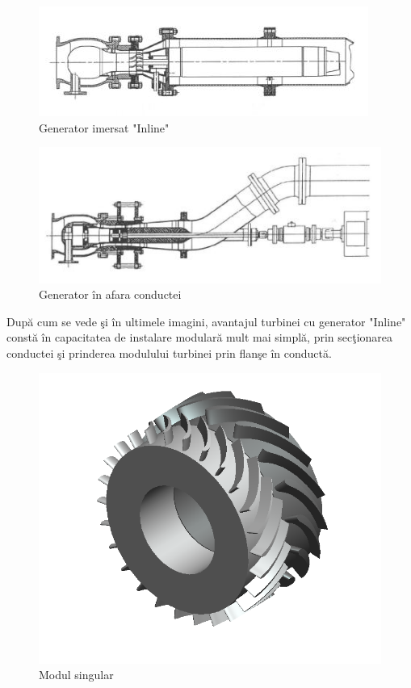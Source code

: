 \begin{figure}[h!]
	\centering
	\includegraphics[scale=1.25]{figures/generator_inline.jpg}
	\caption{Generator imersat "Inline" \cite{GREES_2014}}
	\label{Generator imersat Inline}
\end{figure}

\begin{figure}[h!]
	\centering
	\includegraphics[scale=1.25]{figures/generator_in_afara_conductei.jpg}
	\caption{Generator \^{i}n afara conductei \cite{GREES_2014}}
	\label{Generator \^{i}n afara conductei}
\end{figure}

Dup\u{a} cum se vede \c{s}i \^{i}n ultimele imagini, avantajul turbinei cu generator "Inline" const\u{a} \^{i}n capacitatea de instalare modular\u{a} mult mai simpl\u{a}, prin sec\c{t}ionarea conductei \c{s}i prinderea modulului turbinei prin flan\c{s}e \^{i}n conduct\u{a}.

\begin{figure}[h!]
	\centering
	\includegraphics[scale=0.6]{figures/modul_singular.png}
	\caption{Modul singular \cite{susanhub}}
	\label{Modul singular}
\end{figure}

